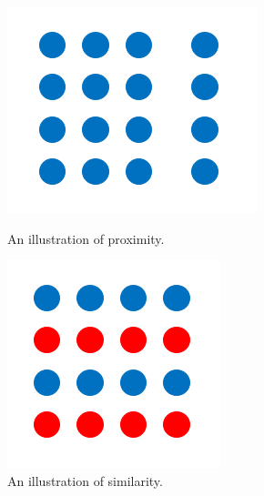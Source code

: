 			\begin{figure}[!htb]
  					\includegraphics[width=\linewidth]{resources/images/proximity.png}
  					\caption{An illustration of proximity.}\label{fig:proximity}
  				\endminipage\hfill
  					\includegraphics[width=\linewidth]{resources/images/similarity.png}
  					\caption{An illustration of similarity.}\label{fig:similarity}

\end{figure}
